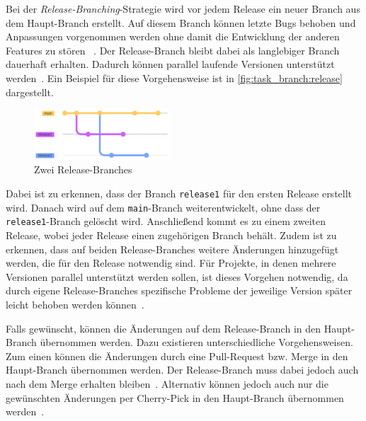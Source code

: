 Bei der \emph{Release\hyp Branching}\hyp Strategie wird vor jedem Release ein neuer Branch aus dem Haupt\hyp Branch erstellt. Auf diesem Branch können letzte Bugs behoben und Anpassungen vorgenommen werden ohne damit die Entwicklung der anderen Features zu stören ~\cite{tucker_basics_2023}. Der Release\hyp Branch bleibt dabei als langlebiger Branch dauerhaft erhalten. Dadurch können parallel laufende Versionen unterstützt werden~\cite{hart_besten_2020}. Ein Beispiel für diese Vorgehensweise ist in \autoref{fig:task_branch:release} dargestellt.

\begin{figure}
    \includegraphics[width=0.45\textwidth]{src/assets/diagrams/task_branch/release-branch.pdf}
    \caption{Zwei Release\hyp Branches}
    \label{fig:task_branch:release}
\end{figure}

Dabei ist zu erkennen, dass der Branch \texttt{release1} für den ersten Release erstellt wird. Danach wird auf dem \texttt{main}\hyp Branch weiterentwickelt, ohne dass der \texttt{release1}-Branch gelöscht wird. Anschließend kommt es zu einem zweiten Release, wobei jeder Release einen zugehörigen Branch behält. Zudem ist zu erkennen, dass auf beiden Release\hyp Branches weitere Änderungen hinzugefügt werden, die für den Release notwendig sind.
Für Projekte, in denen mehrere Versionen parallel unterstützt werden sollen, ist dieses Vorgehen notwendig, da durch eigene Release\hyp Branches spezifische Probleme der jeweilige Version später leicht behoben werden können~\cite{hart_besten_2020}.

Falls gewünscht, können die Änderungen auf dem Release\hyp Branch in den Haupt\hyp Branch übernommen werden. Dazu existieren unterschiedliche Vorgehensweisen. Zum einen können die Änderungen durch eine Pull\hyp Request bzw. Merge in den Haupt\hyp Branch übernommen werden. Der Release\hyp Branch muss dabei jedoch auch nach dem Merge erhalten bleiben~\cite{tucker_basics_2023}. Alternativ können jedoch auch nur die gewünschten Änderungen per Cherry\hyp Pick in den Haupt\hyp Branch übernommen werden~\cite{vijayma_git_2022}.

